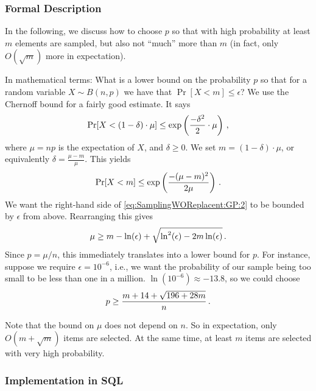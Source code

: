 \subsubsection{Formal Description}

In the following, we discuss how to choose $p$ so that with high probability at least $m$ elements are sampled, but also not ``much'' more than $m$ (in fact, only $O(\sqrt m)$ more in expectation).

In mathematical terms: What is a lower bound on the probability $p$ so that for a random variable $X \sim B(n,p)$ we have that $\Pr[X < m] \leq \epsilon$? We use the Chernoff bound for a fairly good estimate. It says
%
\begin{align*}
	\Pr[X < (1 - \delta) \cdot \mu] \leq \exp\left( \frac{-\delta^2}{2} \cdot \mu \right)
	\SiM,
\end{align*}
where $\mu = np$ is the expectation of $X$, and $\delta \geq 0$. We set $m = (1 - \delta) \cdot \mu$, or equivalently $\delta = \frac{\mu - m}{\mu}$.
%
This yields
\begin{align}
	\Pr[X < m] \leq \exp\left( \frac{-(\mu - m)^2}{2 \mu} \right)
	\SiM. \label{eq:SamplingWOReplacent:GP:2}
\end{align}
%
We want the right-hand side of \eqref{eq:SamplingWOReplacent:GP:2} to be bounded by $\epsilon$ from above. Rearranging this gives
\begin{align*}
	\mu \geq m - \ln(\epsilon) + \sqrt{\ln^2(\epsilon) - 2 m \ln(\epsilon)}
	\SiM.
\end{align*}
Since $p = \mu / n$, this immediately translates into a lower bound for $p$. For instance, suppose we require $\epsilon = 10^{-6}$, i.e., we want the probability of our sample being too small to be less than one in a million. $\ln(10^{-6}) \approx -13.8$, so we could choose
\begin{align*}
	p \geq \frac{m + 14 + \sqrt{196 + 28m}}{n}
	\SiM.
\end{align*}

Note that the bound on $\mu$ does not depend on $n$. So in expectation, only $O(m + \sqrt m)$ items are selected. At the same time, at least $m$ items are selected with very high probability.

\subsubsection{Implementation in SQL}

